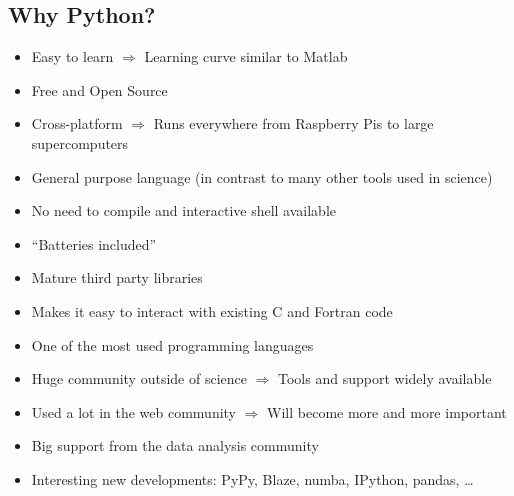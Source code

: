 \documentclass[final]{lmuposter}
\begin{document}
\begin{multicols}{3}
{\section*{Why Python?}
    \begin{itemize}
        \item Easy to learn $\Rightarrow$ Learning curve similar to Matlab
        \item Free and  Open Source
        \item Cross-platform $\Rightarrow$ Runs everywhere from Raspberry Pis to large supercomputers
        \item General purpose language (in contrast to many other tools used in science)
        \item No need to compile and interactive shell available
        \item ``Batteries included''
        \item Mature third party libraries
        \item Makes it easy to interact with existing C and Fortran code

        \item One of the most used programming languages
        \item Huge community outside of science $\Rightarrow$ Tools and support widely available
        \item Used a lot in the web community $\Rightarrow$ Will become more and more important
        \item Big support from the data analysis community
        \item Interesting new developments: PyPy, Blaze, numba, IPython, pandas, \dots
    \end{itemize}
    \vspace{0.245em}
}
\vspace{\MyBoxVSep}

\setlength{\MyBoxWidth}{714mm}

\end{multicols}
\end{document}
